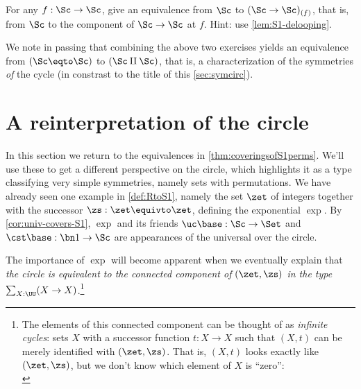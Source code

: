 \begin{xca}\label{xca:(S1->S1)_(f)-eqv-S1}
For any $f: \Sc\to\Sc$, give an equivalence
from $\Sc$ to $(\Sc\to\Sc)_{(f)}$, that is, from $\Sc$ to
the component of $\Sc\to\Sc$ at $f$.
Hint: use \cref{lem:S1-delooping}.
\end{xca}

We note in passing that combining the above two exercises
yields an equivalence from $(\Sc\eqto\Sc)$ to $(\Sc\amalg\Sc)$,
that is, a characterization of the symmetries \emph{of} the cycle
(in constrast to the title of this \cref{sec:symcirc}).


\section{A reinterpretation of the circle}\label{sec:S1isC}

In this section we return to the equivalences in \cref{thm:coveringsofS1perms}.
We'll use these to get a different perspective on the circle,
which highlights it as a type classifying very simple symmetries,
namely sets with permutations.
We have already seen one example in \cref{def:RtoS1},
namely the set $\zet$ of integers together with the successor 
$\zs: \zet\equivto\zet$, defining the exponential \covering $\exp$.
By \cref{cor:univ-covers-S1}, $\exp$ and its friends
$\uc\base:\Sc \to \Set$ and $\cst\base : \bn 1 \to \Sc$
are appearances of the universal \covering over the circle.

The importance of $\exp$ will become apparent when we eventually
explain that \emph{the circle is equivalent to the connected component of
  $(\zet,\zs)$ in the type $\sum_{X:\UU}(X\to X)$}.\footnote{%
  The elements of this connected component can be thought of as
  \emph{infinite cycles}:
  sets $X$ with a successor function $t:X \to X$
  such that $(X,t)$ can be merely identified with $(\zet,\zs)$.
  That is, $(X,t)$ looks exactly like $(\zet,\zs)$,
  but we don't know which element of $X$ is ``zero'':\\[1ex]
  }

